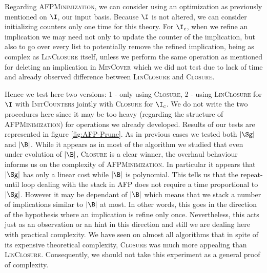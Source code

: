 Regarding \textsc{AFPMinimization}, we can consider using an optimization as
previously mentioned on $\I$, our input basis. Because $\I$ is not altered, we can consider initializing counters only one time for this theory. For $\I_c$, when we refine an implication we may need not only to update the counter of 
the implication, but also to go over every list to potentially remove the
refined implication, being as complex as \textsc{LinClosure} itself, unless we 
perform the same operation as mentioned for deleting an implication in \textsc{MinCover} which we did not test due to lack of time and already observed difference between \textsc{LinClosure} and \textsc{Closure}. 

\vspace{1.2em}

Hence we test here two versions: 1 - only using \textsc{Closure}, 2 - using
\textsc{LinClosure} for $\I$ with \textsc{InitCounters} jointly with 
\textsc{Closure} for $\I_c$. We do not write the two procedures here since
it may be too heavy (regarding the structure of \textsc{AFPMinimization}) for operations we already developed. Results of our tests are represented in 
figure \ref{fig:AFP-Prune}. As in previous cases we tested both $|\Sg|$ and
$|\B|$. While it appears as in most of the algorithm we studied that even
under evolution of $|\B|$, \textsc{Closure} is a clear winner, the overhaul
behaviour informs us on the complexity of \textsc{AFPMinimization}. In particular it appears that $|\Sg|$ has only a linear cost while $|\B|$ is
polynomial. This tells us that the repeat-until loop dealing with the stack
in \textsc{AFP} does not require a time proportional to $|\Sg|$. However it
may be dependant of $|\B|$ which means that we stack a number of implications
similar to $|\B|$ at most. In other words, this goes in the direction of the 
hypothesis where an implication is refine only once. Nevertheless, this acts
just as an observation or an hint in this direction and still we are dealing
here with practical complexity. We have seen on almost all algorithms that
in spite of its expensive theoretical complexity, \textsc{Closure} was much
more appealing than \textsc{LinClosure}. Consequently, we should not take
this experiment as a general proof of complexity. 

\vspace{1.2em}

